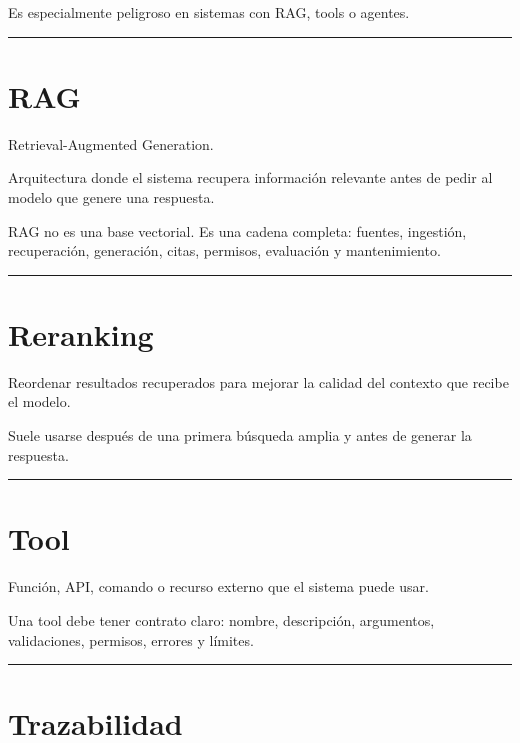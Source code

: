 Es especialmente peligroso en sistemas con RAG, tools o agentes.

\begin{center}\rule{0.5\linewidth}{0.5pt}\end{center}

\section{RAG}\label{rag-5}

Retrieval-Augmented Generation.

Arquitectura donde el sistema recupera información relevante antes de
pedir al modelo que genere una respuesta.

RAG no es una base vectorial. Es una cadena completa: fuentes,
ingestión, recuperación, generación, citas, permisos, evaluación y
mantenimiento.

\begin{center}\rule{0.5\linewidth}{0.5pt}\end{center}

\section{Reranking}\label{reranking-3}

Reordenar resultados recuperados para mejorar la calidad del contexto
que recibe el modelo.

Suele usarse después de una primera búsqueda amplia y antes de generar
la respuesta.

\begin{center}\rule{0.5\linewidth}{0.5pt}\end{center}

\section{Tool}\label{tool-2}

Función, API, comando o recurso externo que el sistema puede usar.

Una tool debe tener contrato claro: nombre, descripción, argumentos,
validaciones, permisos, errores y límites.

\begin{center}\rule{0.5\linewidth}{0.5pt}\end{center}

\section{Trazabilidad}\label{trazabilidad-1}

